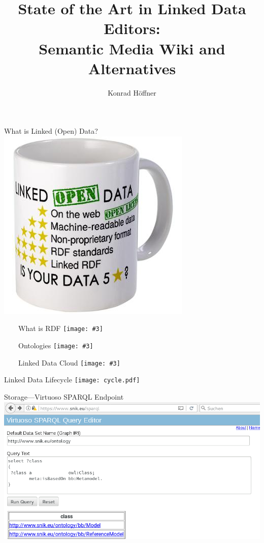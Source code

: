 \documentclass[aspectratio=1610]{beamer}
\title{State of the Art in Linked Data Editors:\\Semantic Media Wiki and Alternatives}
\author{Konrad Höffner}
\newcommand{\imageslide}[4][]
{
\begin{frame}[plain]{~~~~#2}
\vspace{0.2em}
\centering\texttt{[image: \#3]}
\\#1
\note{#4}
\end{frame}
}
\begin{document}
\begin{frame}
\titlepage
\end{frame}

\begin{frame}{What is Linked (Open) Data?}
\centering
\includegraphics[height=0.5\textheight]{img/linked-data-mug.jpg}
\end{frame}

\imageslide{What is RDF}{img/spider.png}{}{}

\imageslide{Ontologies}{img/hitontology.pdf}{}{}

\imageslide{Linked Data Cloud}{img/lodcloud-excerpt-inverted.png}{}{}

\begin{frame}{Linked Data Lifecycle}
\centering
\texttt{[image: cycle.pdf]}
\end{frame}

\begin{frame}{Storage---Virtuoso SPARQL Endpoint}
\centering
\includegraphics[width=\textwidth]{img/sparqlresult.png}
\end{frame}
\end{document}
